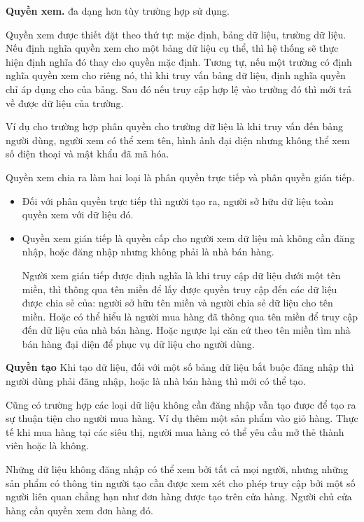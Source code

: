 \documentclass[11pt]{report}
\begin{document}
	\textbf{Quyền xem.}\label{read:permission} đa dạng hơn tùy trường hợp sử dụng.
	
	Quyền xem được thiết đặt theo thứ tự: mặc định, bảng dữ liệu, trường dữ liệu. Nếu định nghĩa quyền xem cho một bảng dữ liệu cụ thể, thì hệ thống sẽ thực hiện định nghĩa đó thay cho quyền mặc định. Tương tự, nếu một trường có định nghĩa quyền xem cho riêng nó, thì khi truy vấn bảng dữ liệu, định nghĩa quyền chỉ áp dụng cho của bảng. Sau đó nếu truy cập hợp lệ vào trường đó thì mới trả về được dữ liệu của trường.
	
	Ví dụ cho trường hợp phân quyền cho trường dữ liệu là khi truy vấn đến bảng người dùng, người xem có thể xem tên, hình ảnh đại diện nhưng không thể xem số điện thoại và mật khẩu đã mã hóa.
	
	Quyền xem chia ra làm hai loại là phân quyền trực tiếp và phân quyền gián tiếp.
	
	\begin{itemize}
		\item Đối với phân quyền trực tiếp thì người tạo ra, người sở hữu dữ liệu toàn quyền xem với dữ liệu đó.
		\item Quyền xem gián tiếp là quyền cấp cho người xem dữ liệu mà không cần đăng nhập, hoặc đăng nhập nhưng không phải là nhà bán hàng.
		
		Người xem gián tiếp được định nghĩa là khi truy cập dữ liệu dưới một tên miền, thì thông qua tên miền để lấy được quyền truy cập đến các dữ liệu được chia sẻ của: người sở hữu tên miền và người chia sẻ dữ liệu cho tên miền. Hoặc có thể hiểu là người mua hàng đã thông qua tên miền để truy cập đến dữ liệu của nhà bán hàng. Hoặc ngược lại căn cứ theo tên miền tìm nhà bán hàng đại diện để phục vụ dữ liệu cho người dùng.
		
	\end{itemize}
	
	\textbf{Quyền tạo} Khi tạo dữ liệu, đối với một số bảng dữ liệu bắt buộc đăng nhập thì người dùng phải đăng nhập, hoặc là nhà bán hàng thì mới có thể tạo.
	
	Cũng có trường hợp các loại dữ liệu không cần đăng nhập vẫn tạo được để tạo ra sự thuận tiện cho người mua hàng. Ví dụ thêm một sản phẩm vào giỏ hàng. Thực tế khi mua hàng tại các siêu thị, người mua hàng có thể yêu cầu mở thẻ thành viên hoặc là không.
	
	Những dữ liệu không đăng nhập có thể xem bởi tất cả mọi người, nhưng những sản phẩm có thông tin người tạo cần được xem xét cho phép truy cập bởi một số người liên quan chẳng hạn như đơn hàng được tạo trên cửa hàng. Người chủ cửa hàng cần quyền xem đơn hàng đó.
	
\end{document}
